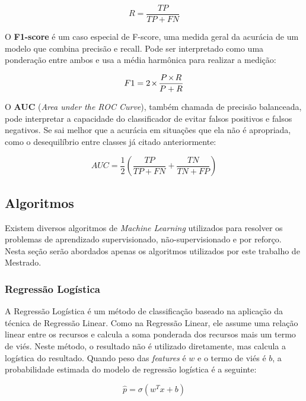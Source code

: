 \documentclass[portugues]{ic-tese}
\let\oldtimes\times
\def\times{{\mkern1mu\oldtimes\mkern1mu}}
\begin{document}
\begin{equation}
R = \frac{TP}{TP + FN}
\end{equation}

O \textbf{F1-score} é um caso especial de F-score, uma medida geral da acurácia de um modelo que combina precisão e recall. Pode ser interpretado como uma ponderação entre ambos e usa a média harmônica para realizar a medição:

\begin{equation}
F1 = 2 \times\frac{P \times R}{P + R}
\end{equation}

O \textbf{AUC} (\textit{Area under the ROC Curve}), também chamada de precisão balanceada, pode interpretar a capacidade do classificador de evitar falsos positivos e falsos negativos. Se sai melhor que a acurácia em situações que ela não é apropriada, como o desequilíbrio entre classes já citado anteriormente:

\begin{equation}
AUC = \frac{1}{2} \left( \frac{TP}{TP + FN} + \frac{TN}{TN + FP} \right)
\end{equation}

\subsection{Algoritmos}

Existem diversos algoritmos de \textit{Machine Learning} utilizados para resolver os problemas de aprendizado supervisionado, não-supervisionado e por reforço. Nesta seção serão abordados apenas os algoritmos utilizados por este trabalho de Mestrado.

\subsubsection{Regressão Logística}

A Regressão Logística é um método de classificação baseado na aplicação da técnica de Regressão Linear. Como na Regressão Linear, ele assume uma relação linear entre os recursos e calcula a soma ponderada dos recursos mais um termo de viés. Neste método, o resultado não é utilizado diretamente, mas calcula a logística do resultado. Quando peso das \textit{features} é $w$ e o termo de viés é $b$, a probabilidade estimada do modelo de regressão logística é a seguinte:

\begin{equation}
\hat{p} = \sigma (w^{T}x + b)
\end{equation}
\end{document}
